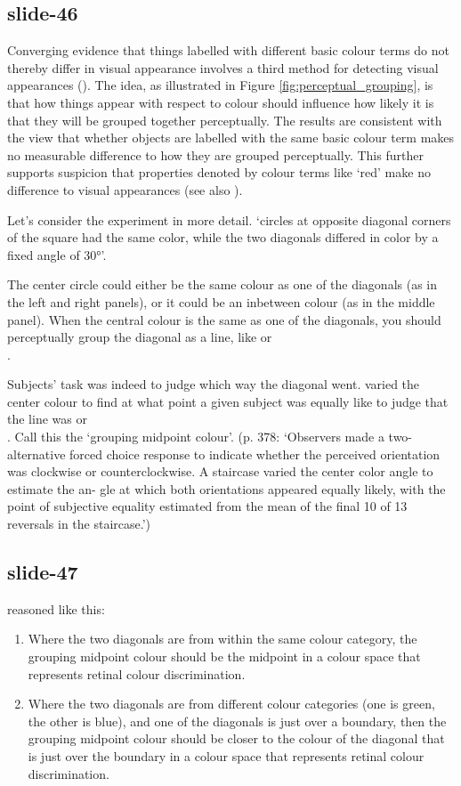 \documentclass[12pt,\papersize]{extarticle}
\begin{document}
\subsection{slide-46}
Converging evidence that things labelled with different basic colour terms
do not thereby differ in visual appearance involves a third method for
detecting visual appearances (\citealp{webster:2012_color}). The idea, as
illustrated in Figure \vref{fig:perceptual_grouping}, is that how things
appear with respect to colour should influence how likely it is that they
will be grouped together perceptually. The results are consistent with the
view that whether objects are labelled with the same basic colour term
makes no measurable difference to how they are grouped perceptually. This
further supports suspicion that properties denoted by colour terms like
‘red’ make no difference to visual appearances (see also
\citealp{davidoff:2012_perceptual}).

Let’s consider the experiment in more detail.
‘circles at opposite diagonal corners of the square had the same color,
while the two diagonals differed in color by a fixed angle of 30°’.

The center circle could either be the same colour as one of the diagonals
(as in the left and right panels),
or it could be an inbetween colour (as in the middle panel).
When the central colour is the same as one of the diagonals, you should perceptually
group the diagonal as a line, like \/ or \\.

Subjects’ task was indeed to judge which way the diagonal went.
\citet{webster:2012_color} varied the center colour to find at what point
a given subject was equally like to judge that the line was \/ or \\.
Call this the ‘grouping midpoint colour’.
(p. 378: ‘Observers made a two-alternative forced choice response to indicate
whether the perceived orientation was clockwise or counterclockwise. A
staircase varied the center color angle to estimate the an- gle at which
both orientations appeared equally likely, with the point of subjective
equality estimated from the mean of the final 10 of 13 reversals in the
staircase.’)

\subsection{slide-47}
\citet{webster:2012_color} reasoned like this:
\begin{enumerate}
\item Where the two diagonals are from within the same colour category,
the grouping midpoint colour should be the midpoint in a colour space that
represents retinal colour discrimination.
\item Where the two diagonals are from different colour categories (one is
green, the other is blue), and one of the diagonals is just over a boundary,
then the grouping midpoint colour should be closer to the colour of the diagonal
that is just over the boundary in a colour space that
represents retinal colour discrimination.
\end{enumerate}
\end{document}
